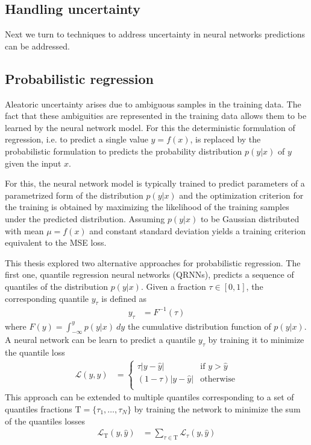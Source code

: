 \begin{description}
\section{Handling uncertainty}

Next we turn to techniques to address uncertainty in neural networks predictions
can be addressed. 

\subsection{Probabilistic regression}

Aleatoric uncertainty arises due to ambiguous samples in the training data.
The fact that  these ambiguities are represented in the training data allows
them to be learned by the neural network model. For this the deterministic
formulation of regression, i.e. to predict a single value $y = f(x)$, is
replaced by the probabilistic formulation to predicts the probability
distribution $p(y|x)$ of $y$ given the input $x$.

For this, the neural network model is typically trained to predict parameters of
a parametrized form of the distribution $p(y|x)$ and the optimization criterion
for the training is obtained by maximizing the likelihood of the training
samples under the predicted distribution. Assuming $p(y|x)$ to be Gaussian
distributed with mean $\mu = f(x)$ and constant standard deviation yields a
training criterion equivalent to the MSE loss.

This thesis explored two alternative approaches for probabilistic regression.
The first one, quantile regression neural networks (QRNNs), predicts a sequence
of quantiles of the distribution $p(y|x)$. Given a fraction $\tau \in [0, 1]$,
the corresponding quantile $y_\tau$ is defined as
\begin{align}
  y_\tau &= F^{-1}(\tau)
\end{align}
where $F(y) = \int_{-\infty}^y p(y|x)\ dy$ the cumulative distribution
function of $p(y|x)$. A neural network can be learn to predict a quantile
$y_\tau$ by training it to minimize the quantile loss
\begin{align}
  \mathcal{L}(y, \hat{y}) &=
  \begin{cases}
    \tau  |y - \hat{y}| & \text{if } y > \hat{y} \\
    (1 - \tau)  |y - \hat{y}| & \text{otherwise} \\
    \end{cases}
\end{align}
This approach can be extended to multiple quantiles corresponding to
a set of quantiles fractions $\mathrm{T} = \{\tau_1, \ldots, \tau_N\}$ by training
the network to minimize the sum of the quantiles losses
\begin{align}
  \mathcal{L}_\mathrm{T}(y, \hat{y}) &= 
  \sum_{\tau \in \mathrm{T}} \mathcal{L}_\tau(y, \hat{y})
\end{align}


\end{description}
